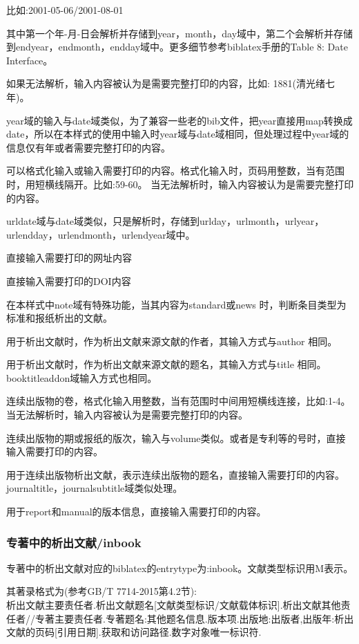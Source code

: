 \begin{description}[topsep=5pt,partopsep=0pt,parsep=0pt,%
itemsep=0pt,leftmargin=2.2cm,rightmargin=0.5cm,labelwidth=2cm]
      比如:2001-05-06/2001-08-01

      其中第一个年-月-日会解析并存储到year，month，day域中，第二个会解析并存储到endyear，endmonth，endday域中。更多细节参考biblatex手册的Table 8: Date Interface。

      如果无法解析，输入内容被认为是需要完整打印的内容，比如:
      1881(清光绪七年)。

      year域的输入与date域类似，为了兼容一些老的bib文件，把year直接用map转换成date，所以在本样式的使用中输入时year域与date域相同，但处理过程中year域的信息仅有年或者需要完整打印的内容。

  \item[pages] 可以格式化输入或输入需要打印的内容。格式化输入时，页码用整数，当有范围时，用短横线隔开。比如:59-60。 当无法解析时，输入内容被认为是需要完整打印的内容。
  \item[urldate] urldate域与date域类似，只是解析时，存储到urlday，urlmonth，urlyear，urlendday，urlendmonth，urlendyear域中。
  \item[url] 直接输入需要打印的网址内容
  \item[doi] 直接输入需要打印的DOI内容
  \item[note] 在本样式中note域有特殊功能，当其内容为standard或news 时，判断条目类型为标准和报纸析出的文献。
  \item[bookauthor] 用于析出文献时，作为析出文献来源文献的作者，其输入方式与author 相同。
  \item[booktitle] 用于析出文献时，作为析出文献来源文献的题名，其输入方式与title 相同。booktitleaddon域输入方式也相同。
  \item[volume] 连续出版物的卷，格式化输入用整数，当有范围时中间用短横线连接，比如:1-4。当无法解析时，输入内容被认为是需要完整打印的内容。
  \item[number] 连续出版物的期或报纸的版次，输入与volume类似。或者是专利等的号时，直接输入需要打印的内容。
  \item[journal] 用于连续出版物析出文献，表示连续出版物的题名，直接输入需要打印的内容。journaltitle，journalsubtitle域类似处理。
   \item[version] 用于report和manual的版本信息，直接输入需要打印的内容。
\end{description}

\subsubsection{专著中的析出文献/inbook}
\begin{refentry}{}{}
专著中的析出文献对应的biblatex的entrytype为:inbook。文献类型标识用M表示。

其著录格式为(参考GB/T 7714-2015第4.2节):\\
析出文献主要责任者.析出文献题名[文献类型标识/文献载体标识].析出文献其他责任者//专著主要责任者.专著题名:其他题名信息.版本项.出版地:出版者,出版年:析出文献的页码[引用日期].获取和访问路径.数字对象唯一标识符.
\end{refentry}

